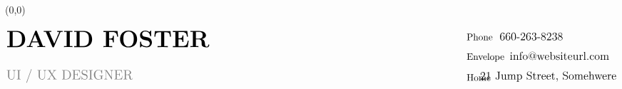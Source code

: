 \documentclass[8pt, one side]{scrartcl}
\newcommand{\icon}[1]{%
	\text{#1}
}
\begin{document}
\begin{textblock}{20}(0,0)
\hfill\\[5cm]

\end{textblock}

  $$\begin{aligned}&{\Huge{\textbf{DAVID FOSTER}}} \\&\textcolor{gray}{\Large{\text{UI / UX DESIGNER}}}\end{aligned}\hspace{27em} \begin{aligned}&\icon{Phone}\,\,\text{\large{ 660-263-8238}}\\[0.2cm]&
\icon{Envelope}\, \text{\large{ info@websiteurl.com}}\\[0.2cm]&
{\makebox[8.5pt][l]{\hspace*{0cm}\raisebox{-0.3ex}{\icon{Home}}}}\, \text{\large{ 21 Jump Street, Somehwere}}\\
	\end{aligned}\\[-1cm] $$
\end{document}
